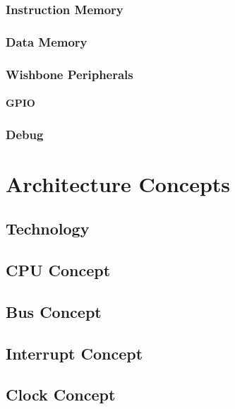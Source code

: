 \subsection{Instruction Memory}

\subsection{Data Memory}

\subsection{Wishbone Peripherals}
\subsubsection{GPIO}

\subsection{Debug}


\chapter{Architecture Concepts}



\section{Technology}

\section{CPU Concept}





\section{Bus Concept}

\section{Interrupt Concept}

\section{Clock Concept}

